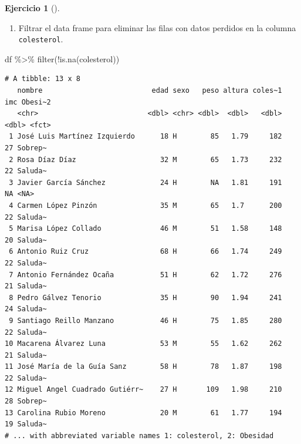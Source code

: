 \documentclass[
  a4paper,
]{scrreport}
\newenvironment{Shaded}{\begin{snugshade}}{\end{snugshade}}
\newcommand{\FunctionTok}[1]{\textcolor[rgb]{0.28,0.35,0.67}{#1}}
\newcommand{\NormalTok}[1]{\textcolor[rgb]{0.00,0.23,0.31}{#1}}
\newcommand{\SpecialCharTok}[1]{\textcolor[rgb]{0.37,0.37,0.37}{#1}}
\providecommand{\tightlist}{%
  \setlength{\itemsep}{0pt}\setlength{\parskip}{0pt}}\usepackage{longtable,booktabs,array}
\theoremstyle{definition}
\newtheorem{exercise}{Ejercicio}[chapter]
\theoremstyle{remark}
\begin{document}
\begin{exercise}[]
\begin{tcolorbox}
\end{tcolorbox}

\begin{enumerate}
\def\labelenumi{\roman{enumi}.}
\tightlist
\item
  Filtrar el data frame para eliminar las filas con datos perdidos en la
  columna \texttt{colesterol}.
\end{enumerate}

\begin{tcolorbox}[enhanced jigsaw, coltitle=black, breakable, bottomtitle=1mm, colbacktitle=quarto-callout-tip-color!10!white, rightrule=.15mm, opacityback=0, opacitybacktitle=0.6, left=2mm, colframe=quarto-callout-tip-color-frame, title=\textcolor{quarto-callout-tip-color}{\faLightbulb}\hspace{0.5em}{Solución}, toprule=.15mm, toptitle=1mm, arc=.35mm, colback=white, titlerule=0mm, bottomrule=.15mm, leftrule=.75mm]

\begin{Shaded}
\begin{Highlighting}[]
\NormalTok{df }\SpecialCharTok{\%\textgreater{}\%}
    \FunctionTok{filter}\NormalTok{(}\SpecialCharTok{!}\FunctionTok{is.na}\NormalTok{(colesterol))}
\end{Highlighting}
\end{Shaded}

\begin{verbatim}
# A tibble: 13 x 8
   nombre                          edad sexo   peso altura coles~1   imc Obesi~2
   <chr>                          <dbl> <chr> <dbl>  <dbl>   <dbl> <dbl> <fct>  
 1 José Luis Martínez Izquierdo      18 H        85   1.79     182    27 Sobrep~
 2 Rosa Díaz Díaz                    32 M        65   1.73     232    22 Saluda~
 3 Javier García Sánchez             24 H        NA   1.81     191    NA <NA>   
 4 Carmen López Pinzón               35 M        65   1.7      200    22 Saluda~
 5 Marisa López Collado              46 M        51   1.58     148    20 Saluda~
 6 Antonio Ruiz Cruz                 68 H        66   1.74     249    22 Saluda~
 7 Antonio Fernández Ocaña           51 H        62   1.72     276    21 Saluda~
 8 Pedro Gálvez Tenorio              35 H        90   1.94     241    24 Saluda~
 9 Santiago Reillo Manzano           46 H        75   1.85     280    22 Saluda~
10 Macarena Álvarez Luna             53 M        55   1.62     262    21 Saluda~
11 José María de la Guía Sanz        58 H        78   1.87     198    22 Saluda~
12 Miguel Angel Cuadrado Gutiérr~    27 H       109   1.98     210    28 Sobrep~
13 Carolina Rubio Moreno             20 M        61   1.77     194    19 Saluda~
# ... with abbreviated variable names 1: colesterol, 2: Obesidad
\end{verbatim}


\end{tcolorbox}
\end{exercise}
\end{document}
